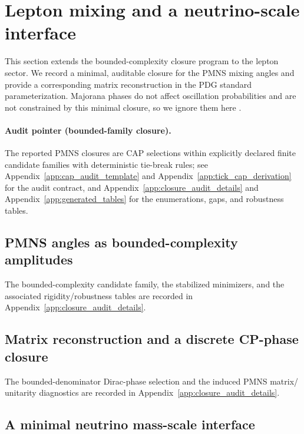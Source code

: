 \section{Lepton mixing and a neutrino-scale interface}
\label{sec:pmns_neutrino_closure}

This section extends the bounded-complexity closure program to the lepton sector.
We record a minimal, auditable closure for the PMNS mixing angles and provide a corresponding matrix reconstruction in the PDG standard parameterization.
Majorana phases do not affect oscillation probabilities and are not constrained by this minimal closure, so we ignore them here \cite{PDGRPP2024}.

\paragraph{Audit pointer (bounded-family closure).}
\AuditTag The reported PMNS closures are CAP selections within explicitly declared finite candidate families with deterministic tie-break rules; see Appendix~\ref{app:cap_audit_template} and Appendix~\ref{app:tick_cap_derivation} for the audit contract, and Appendix~\ref{app:closure_audit_details} and Appendix~\ref{app:generated_tables} for the enumerations, gaps, and robustness tables.

\subsection{PMNS angles as bounded-complexity amplitudes}
\label{subsec:pmns_mixing_depths}

The bounded-complexity candidate family, the stabilized minimizers, and the associated rigidity/robustness tables are recorded in Appendix~\ref{app:closure_audit_details}.

\subsection{Matrix reconstruction and a discrete CP-phase closure}
\label{subsec:pmns_matrix_closure}

The bounded-denominator Dirac-phase selection and the induced PMNS matrix/ unitarity diagnostics are recorded in Appendix~\ref{app:closure_audit_details}.

\subsection{A minimal neutrino mass-scale interface}
\label{subsec:neutrino_mass_interface}

